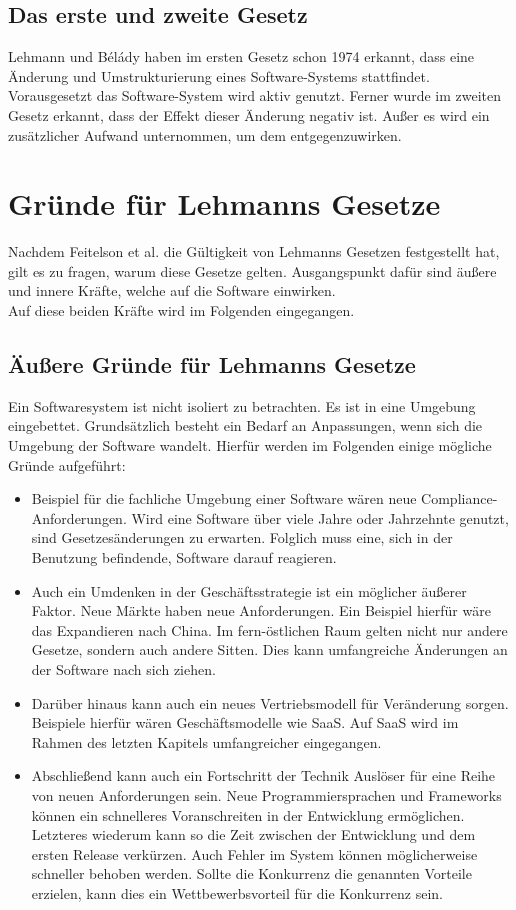 \subsection{Das erste und zweite Gesetz}
Lehmann und Bélády haben im ersten Gesetz schon 1974 erkannt, dass eine Änderung und Umstrukturierung eines Software-Systems stattfindet. Vorausgesetzt das Software-System wird aktiv genutzt. Ferner wurde im zweiten Gesetz erkannt, dass der Effekt dieser Änderung negativ ist. Außer es wird ein zusätzlicher Aufwand unternommen, um dem entgegenzuwirken.
\pagebreak

\section{Gründe für Lehmanns Gesetze}
Nachdem Feitelson et al. die Gültigkeit von Lehmanns Gesetzen festgestellt hat, gilt es zu fragen, warum diese Gesetze gelten. Ausgangspunkt dafür sind äußere und innere Kräfte, welche auf die Software einwirken.\\
Auf diese beiden Kräfte wird im Folgenden eingegangen.

\subsection{Äußere Gründe für Lehmanns Gesetze}
Ein Softwaresystem ist nicht isoliert zu betrachten. Es ist in eine Umgebung eingebettet. Grundsätzlich besteht ein Bedarf an Anpassungen, wenn sich die Umgebung der Software wandelt.\cite{bommer_softwarewartung_2016} Hierfür werden im Folgenden einige mögliche Gründe aufgeführt:

\begin{itemize}
    \item Beispiel für die fachliche Umgebung einer Software wären neue Compliance-Anforderungen. Wird eine Software über viele Jahre oder Jahrzehnte genutzt, sind Gesetzesänderungen zu erwarten. Folglich muss eine, sich in der Benutzung befindende, Software darauf reagieren.
    \item Auch ein Umdenken in der Geschäftsstrategie ist ein möglicher äußerer Faktor. Neue Märkte haben neue Anforderungen. Ein Beispiel hierfür wäre das Expandieren nach China. Im fern-östlichen Raum gelten nicht nur andere Gesetze, sondern auch andere Sitten. Dies kann umfangreiche Änderungen an der Software nach sich ziehen.
    \item Darüber hinaus kann auch ein neues Vertriebsmodell für Veränderung sorgen. Beispiele hierfür wären Geschäftsmodelle wie \ac{SaaS}. Auf \acs{SaaS} wird im Rahmen des letzten Kapitels umfangreicher eingegangen.
    \item Abschließend kann auch ein Fortschritt der Technik Auslöser für eine Reihe von neuen Anforderungen sein. Neue Programmiersprachen und Frameworks können ein schnelleres Voranschreiten in der Entwicklung ermöglichen. Letzteres wiederum kann so die Zeit zwischen der Entwicklung und dem ersten Release verkürzen. Auch Fehler im System können möglicherweise schneller behoben werden. Sollte die Konkurrenz die genannten Vorteile erzielen, kann dies ein Wettbewerbsvorteil für die Konkurrenz sein.
\end{itemize}

